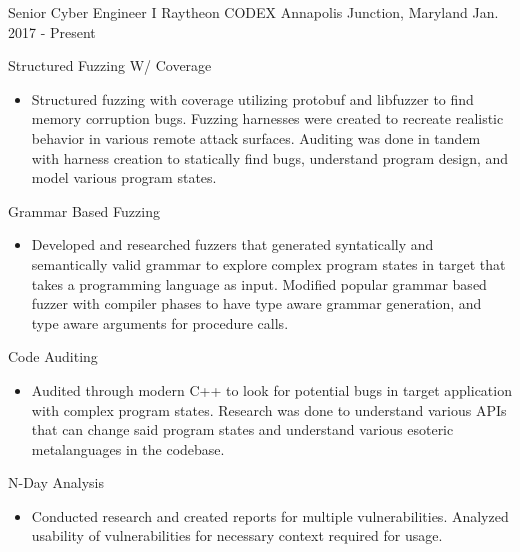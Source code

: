 

\begin{cventries}

  \cventry
    {Senior Cyber Engineer I} %
    {Raytheon CODEX} %
    {Annapolis Junction, Maryland} %
    {Jan. 2017 - Present} %
    {
      \begin{cvitems} %
        \item {Structured Fuzzing W/ Coverage}
        \begin{itemize}
          \item {Structured fuzzing with coverage utilizing protobuf and libfuzzer to find memory corruption bugs. Fuzzing harnesses were created to recreate realistic behavior in various remote attack surfaces.  Auditing was done in tandem with harness creation to statically find bugs, understand program design, and model various program states. }
        \end{itemize}
        \item {Grammar Based Fuzzing}
        \begin{itemize}
          \item {Developed and researched fuzzers that generated syntatically and semantically valid grammar to explore complex program states in target that takes a programming language as input. Modified popular grammar based fuzzer with compiler phases to have type aware grammar generation, and type aware arguments for procedure calls.}
        \end{itemize}
        \item {Code Auditing}
        \begin{itemize}
          \item {Audited through modern C++ to look for potential bugs in target application with complex program states. Research was done to understand various APIs that can change said program states and understand various esoteric metalanguages in the codebase.}
        \end{itemize}
        \item {N-Day Analysis}
        \begin{itemize}
          \item {Conducted research and created reports for multiple vulnerabilities. Analyzed usability of vulnerabilities for necessary context required for usage.}
        \end{itemize}
      \end{cvitems}
    }


\end{cventries}
